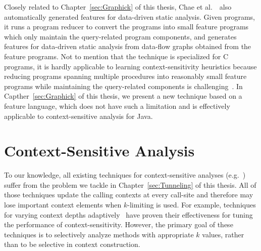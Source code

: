 Closely related to Chapter~\ref{sec:Graphick} of this thesis, Chae et al.~\cite{ChOhHeYa17}~also automatically generated features for data-driven static analysis.
Given programs, it runs a program reducer to convert the programs into small feature programs which only maintain the query-related program components,
and generates features for data-driven static analysis from data-flow graphs obtained from the feature programs.
Not to mention that the technique is specialized for C programs, it is hardly applicable to learning context-sensitivity heuristics because reducing programs spanning multiple procedures into reasonably small feature programs while maintaining the query-related components is challenging~\cite{ChOhHeYa17}. In Capther~\ref{sec:Graphick} of this thesis, we present a new technique based on a feature language, which does not have such a limitation and is effectively applicable to context-sensitive analysis for Java.




\section{Context-Sensitive Analysis} To our knowledge, all
existing techniques for context-sensitive analyses
(e.g.~\cite{Sharir1981,Milanova2002,Shivers1988,
  Whaley2004,Milanova2005,Smaragdakis2011, Khedker2008,
  Karkare2007,WeiR15,Smaragdakis2014,JeJeChOh17,Oh2014,TanLX16})
suffer from the problem we tackle in Chapter~\ref{sec:Tunneling} of this thesis. All of those
techniques update the calling contexts at every call-site and
therefore may lose important context elements when $k$-limiting is used.  For example,
techniques for varying context depths
adaptively~\cite{WeiR15,JeJeChOh17,Oh2014, Smaragdakis2014} have proven
their effectiveness for tuning the performance of context-sensitivity.  However,
the primary goal of these techniques is to selectively analyze methods
with appropriate $k$ values, rather than to be selective in context
construction.


